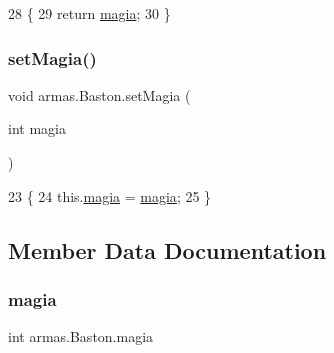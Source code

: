 \begin{DoxyCode}
28     \{
29         \textcolor{keywordflow}{return} \mbox{\hyperlink{classarmas_1_1_baston_a36ffe8a19130123c5ef91918c2a5c2db}{magia}};
30     \}
\end{DoxyCode}
\mbox{\label{classarmas_1_1_baston_a751769c59bb879f959b742e2176cbc8b}} 
\subsubsection{\texorpdfstring{set\+Magia()}{setMagia()}}
{\footnotesize\ttfamily void armas.\+Baston.\+set\+Magia (\begin{DoxyParamCaption}\item[{int}]{magia }\end{DoxyParamCaption})\hspace{0.3cm}{\ttfamily [inline]}}


\begin{DoxyCode}
23     \{
24         this.\mbox{\hyperlink{classarmas_1_1_baston_a36ffe8a19130123c5ef91918c2a5c2db}{magia}} = \mbox{\hyperlink{classarmas_1_1_baston_a36ffe8a19130123c5ef91918c2a5c2db}{magia}};
25     \}
\end{DoxyCode}


\subsection{Member Data Documentation}
\mbox{\label{classarmas_1_1_baston_a36ffe8a19130123c5ef91918c2a5c2db}} 
\subsubsection{\texorpdfstring{magia}{magia}}
{\footnotesize\ttfamily int armas.\+Baston.\+magia\hspace{0.3cm}{\ttfamily [private]}}

